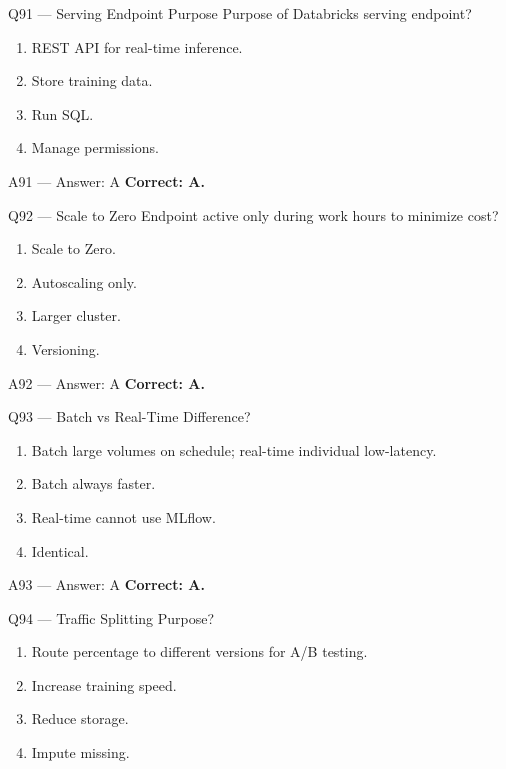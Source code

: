 \documentclass[aspectratio=169,9pt]{beamer}
\begin{document}
	\begin{frame}{Q91 — Serving Endpoint Purpose}
		Purpose of Databricks serving endpoint?
		\begin{enumerate}[label=\Alph*.]
			\item REST API for real-time inference.
			\item Store training data.
			\item Run SQL.
			\item Manage permissions.
		\end{enumerate}
	\end{frame}
	
	\begin{frame}{A91 — Answer: A}
		\textbf{Correct: A.}
	\end{frame}
	
	\begin{frame}{Q92 — Scale to Zero}
		Endpoint active only during work hours to minimize cost?
		\begin{enumerate}[label=\Alph*.]
			\item Scale to Zero.
			\item Autoscaling only.
			\item Larger cluster.
			\item Versioning.
		\end{enumerate}
	\end{frame}
	
	\begin{frame}{A92 — Answer: A}
		\textbf{Correct: A.}
	\end{frame}
	
	\begin{frame}{Q93 — Batch vs Real-Time}
		Difference?
		\begin{enumerate}[label=\Alph*.]
			\item Batch large volumes on schedule; real-time individual low-latency.
			\item Batch always faster.
			\item Real-time cannot use MLflow.
			\item Identical.
		\end{enumerate}
	\end{frame}
	
	\begin{frame}{A93 — Answer: A}
		\textbf{Correct: A.}
	\end{frame}
	
	\begin{frame}{Q94 — Traffic Splitting}
		Purpose?
		\begin{enumerate}[label=\Alph*.]
			\item Route percentage to different versions for A/B testing.
			\item Increase training speed.
			\item Reduce storage.
			\item Impute missing.
		\end{enumerate}
	\end{frame}
	
\end{document}
